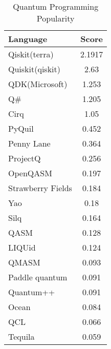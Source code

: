 \documentclass[conference]{IEEEtran}
\begin{document}
\begin{table}[h!]
  \begin{center}
    \caption{Quantum Programming Popularity}
    \label{tab:table1}
    \begin{tabular}{l|c} %
      \textbf{Language} & \textbf{Score}\\
      \hline
      Qiskit(terra) & 2.1917\\
      Quiskit(qiskit) & 2.63\\
      QDK(Microsoft) & 1.253 \\
      Q\# & 1.205 \\
      Cirq & 1.05 \\
      PyQuil & 0.452 \\
      Penny Lane & 0.364 \\
      ProjectQ & 0.256 \\
      OpenQASM & 0.197 \\
      Strawberry Fields & 0.184 \\
      Yao & 0.18 \\
      Silq & 0.164 \\
      QASM & 0.128 \\
      LIQUid & 0.124 \\
      QMASM & 0.093 \\
      Paddle quantum & 0.091 \\
      Quantum++ & 0.091 \\
      Ocean & 0.084 \\
      QCL & 0.066 \\
      Tequila & 0.059 \\
    \end{tabular}
  \end{center}
\end{table}
\end{document}
